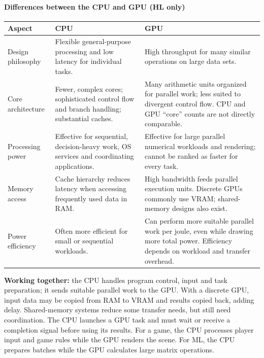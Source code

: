 \documentclass[a4paper,12pt]{article}
\begin{document}
\paragraph{Differences between the CPU and GPU (HL only)}
\begin{center}
\begin{tabularx}{0.98\linewidth}{p{2.7cm} X X}
\toprule
\textbf{Aspect} & \textbf{CPU} & \textbf{GPU} \\
\midrule
Design philosophy & Flexible general-purpose processing and low latency for individual tasks. & High throughput for many similar operations on large data sets. \\
Core architecture & Fewer, complex cores; sophisticated control flow and branch handling; substantial caches. & Many arithmetic units organized for parallel work; less suited to divergent control flow. CPU and GPU ``core'' counts are not directly comparable. \\
Processing power & Effective for sequential, decision-heavy work, OS services and coordinating applications. & Effective for large parallel numerical workloads and rendering; cannot be ranked as faster for every task. \\
Memory access & Cache hierarchy reduces latency when accessing frequently used data in RAM. & High bandwidth feeds parallel execution units. Discrete GPUs commonly use VRAM; shared-memory designs also exist. \\
Power efficiency & Often more efficient for small or sequential workloads. & Can perform more suitable parallel work per joule, even while drawing more total power. Efficiency depends on workload and transfer overhead. \\
\bottomrule
\end{tabularx}
\end{center}
\textbf{Working together:} the CPU handles program control, input and task preparation; it sends suitable parallel work to the GPU. With a discrete GPU, input data may be copied from RAM to VRAM and results copied back, adding delay. Shared-memory systems reduce some transfer needs, but still need coordination. The CPU launches a GPU task and must wait or receive a completion signal before using its results. For a game, the CPU processes player input and game rules while the GPU renders the scene. For ML, the CPU prepares batches while the GPU calculates large matrix operations.
\end{document}
